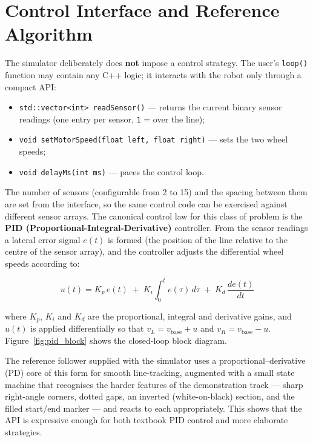 \section{Control Interface and Reference Algorithm}
The simulator deliberately does \textbf{not} impose a control strategy. The user's \texttt{loop()} function may contain any C++ logic; it interacts with the robot only through a compact API:

\begin{itemize}
    \item \texttt{std::vector<int> readSensor()} --- returns the current binary sensor readings (one entry per sensor, \texttt{1} = over the line);
    \item \texttt{void setMotorSpeed(float left, float right)} --- sets the two wheel speeds;
    \item \texttt{void delayMs(int ms)} --- paces the control loop.
\end{itemize}

The number of sensors (configurable from 2 to 15) and the spacing between them are set from the interface, so the same control code can be exercised against different sensor arrays. The canonical control law for this class of problem is the \textbf{PID (Proportional-Integral-Derivative)} controller. From the sensor readings a lateral error signal $e(t)$ is formed (the position of the line relative to the centre of the sensor array), and the controller adjusts the differential wheel speeds according to:

\begin{equation}
    u(t) = K_p \, e(t) \;+\; K_i \int_0^t e(\tau)\,d\tau \;+\; K_d \,\frac{de(t)}{dt}
    \label{eq:pid}
\end{equation}

\noindent where $K_p$, $K_i$ and $K_d$ are the proportional, integral and derivative gains, and $u(t)$ is applied differentially so that $v_L = v_{\text{base}} + u$ and $v_R = v_{\text{base}} - u$. Figure~\ref{fig:pid_block} shows the closed-loop block diagram.

The reference follower supplied with the simulator uses a proportional–derivative (PD) core of this form for smooth line-tracking, augmented with a small state machine that recognises the harder features of the demonstration track --- sharp right-angle corners, dotted gaps, an inverted (white-on-black) section, and the filled start/end marker --- and reacts to each appropriately. This shows that the API is expressive enough for both textbook PID control and more elaborate strategies.

